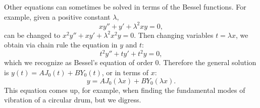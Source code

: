 \documentclass{ximera}
\begin{document}
\begin{example}
    Other equations can sometimes be solved in terms of the Bessel functions. For example, given a positive constant $\lambda$,
    \begin{equation*}
        x y'' + y' + \lambda^2 x y = 0 ,
    \end{equation*}
        can be changed to $x^2 y'' + x y' + \lambda^2 x^2 y = 0$.  Then changing variables $t = \lambda x$, we obtain via chain rule the equation in $y$ and $t$:
    \begin{equation*}
        t^2 y'' + t y' + t^2 y = 0 ,
    \end{equation*}
    which we recognize as Bessel's equation of order 0.  Therefore the general solution is $y(t) = A J_0(t) + B Y_0(t)$, or in terms of $x$:
    \begin{equation*}
        y = A J_0(\lambda x) + B Y_0(\lambda x) .
    \end{equation*}
    This equation comes up, for example, when finding the fundamental modes of vibration of a circular drum, but we digress.
\end{example}
\end{document}
